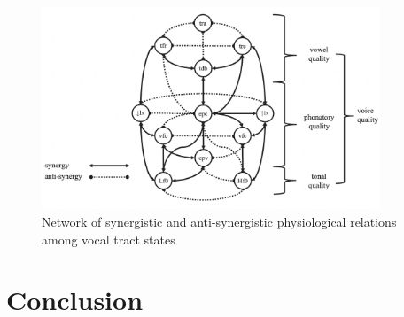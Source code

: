 \documentclass[12pt, letterpaper]{article}
\begin{document}
\begin{figure}[!ht]
	\caption{Network of synergistic and anti-synergistic physiological relations among vocal tract states}
	\label{fig:LAMNetwork}
	\centering
	\includegraphics[width=0.9\textwidth]{../LAMNetwork.png}
\end{figure}
	


\section{Conclusion} \label{sec:Conclusion}


\printbibliography[heading=bibintoc]
\end{document}
